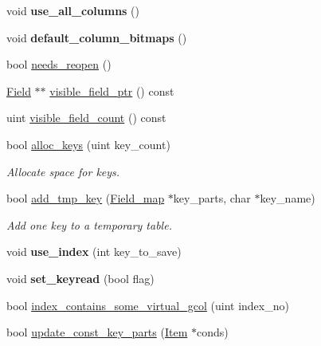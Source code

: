 \begin{DoxyCompactItemize}
\item 
\mbox{\label{structTABLE_a2cc2dea9449705b60647bc7c35146ecf}} 
void {\bfseries use\+\_\+all\+\_\+columns} ()
\item 
\mbox{\label{structTABLE_ac561b968570615b47045ae5ddbf89b7e}} 
void {\bfseries default\+\_\+column\+\_\+bitmaps} ()
\item 
bool \mbox{\hyperlink{structTABLE_a2557166f01a25c157d4c16dd3305bddb}{needs\+\_\+reopen}} ()
\item 
\mbox{\hyperlink{classField}{Field}} $\ast$$\ast$ \mbox{\hyperlink{structTABLE_a81f6a41f3ec445d4b029f067b90d1ddd}{visible\+\_\+field\+\_\+ptr}} () const
\item 
uint \mbox{\hyperlink{structTABLE_a844377a21852fe7925a6a7248fc2bce4}{visible\+\_\+field\+\_\+count}} () const
\item 
bool \mbox{\hyperlink{structTABLE_a6e1532a0f768fbb90b2151a4890b4936}{alloc\+\_\+keys}} (uint key\+\_\+count)
\begin{DoxyCompactList}\small\item\em Allocate space for keys. \end{DoxyCompactList}\item 
bool \mbox{\hyperlink{structTABLE_ad78429d129e0432b21bfdb41c05f928a}{add\+\_\+tmp\+\_\+key}} (\mbox{\hyperlink{classBitmap}{Field\+\_\+map}} $\ast$key\+\_\+parts, char $\ast$key\+\_\+name)
\begin{DoxyCompactList}\small\item\em Add one key to a temporary table. \end{DoxyCompactList}\item 
\mbox{\label{structTABLE_af31de97ed7509006102fdda07eff437b}} 
void {\bfseries use\+\_\+index} (int key\+\_\+to\+\_\+save)
\item 
\mbox{\label{structTABLE_a57cdc5d8841e7c7ad94f3b497a1b958f}} 
void {\bfseries set\+\_\+keyread} (bool flag)
\item 
bool \mbox{\hyperlink{structTABLE_a8c111124df42ff0b1749cea69411c8c0}{index\+\_\+contains\+\_\+some\+\_\+virtual\+\_\+gcol}} (uint index\+\_\+no)
\item 
bool \mbox{\hyperlink{structTABLE_aded373553a351dbb53ae979e21aacd48}{update\+\_\+const\+\_\+key\+\_\+parts}} (\mbox{\hyperlink{classItem}{Item}} $\ast$conds)
\item 
$$
\end{DoxyCompactItemize}
